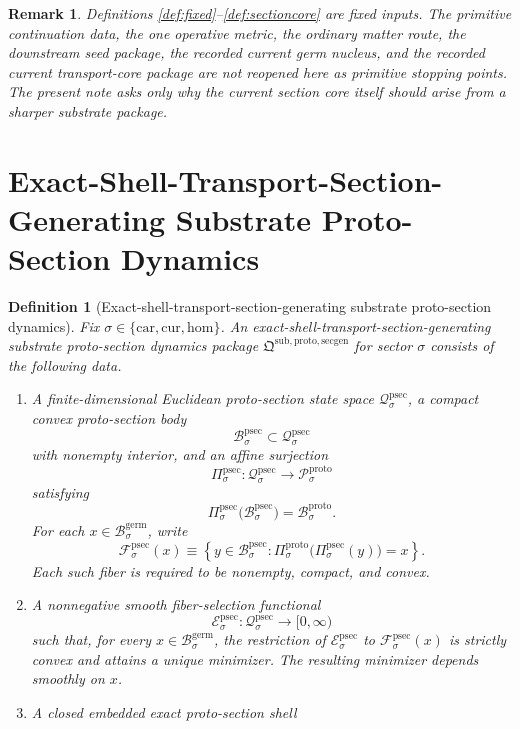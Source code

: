 \documentclass[11pt]{article}
\newcommand{\Car}{\mathrm{car}}
\newcommand{\Cur}{\mathrm{cur}}
\newcommand{\Hom}{\mathrm{hom}}
\newcommand{\GermBody}[1]{\mathcal B_{#1}^{\mathrm{germ}}}
\newcommand{\ProtoState}[1]{\mathcal P_{#1}^{\mathrm{proto}}}
\newcommand{\ProtoBody}[1]{\mathcal B_{#1}^{\mathrm{proto}}}
\newcommand{\ProtoProj}[1]{\Pi_{#1}^{\mathrm{proto}}}
\newcommand{\ProtoSectionPackage}{\mathfrak Q^{\mathrm{sub,proto,secgen}}}
\newcommand{\ProtoSectionState}[1]{\mathcal Q_{#1}^{\mathrm{psec}}}
\newcommand{\ProtoSectionBody}[1]{\mathcal B_{#1}^{\mathrm{psec}}}
\newcommand{\ProtoSectionProj}[1]{\Pi_{#1}^{\mathrm{psec}}}
\newcommand{\ProtoSectionFiber}[2]{\mathcal F_{#1}^{\mathrm{psec}}(#2)}
\newcommand{\ProtoSectionFunctional}[1]{\mathscr E_{#1}^{\mathrm{psec}}}
\newtheorem{definition}{Definition}
\newtheorem{remark}{Remark}
\begin{document}
\begin{remark}
Definitions \ref{def:fixed}--\ref{def:sectioncore} are fixed inputs. The primitive continuation data, the one operative metric, the ordinary matter route, the downstream seed package, the recorded current germ nucleus, and the recorded current transport-core package are not reopened here as primitive stopping points. The present note asks only why the current section core itself should arise from a sharper substrate package.
\end{remark}

\section{Exact-Shell-Transport-Section-Generating Substrate Proto-Section Dynamics}

\begin{definition}[Exact-shell-transport-section-generating substrate proto-section dynamics]
\label{def:protosection}
Fix \(\sigma\in\{\Car,\Cur,\Hom\}\). An \emph{exact-shell-transport-section-generating substrate proto-section dynamics package} \(\ProtoSectionPackage\) for sector \(\sigma\) consists of the following data.
\begin{enumerate}
    \item A finite-dimensional Euclidean proto-section state space \(\ProtoSectionState{\sigma}\), a compact convex proto-section body
    \[
    \ProtoSectionBody{\sigma}\subset\ProtoSectionState{\sigma}
    \]
    with nonempty interior, and an affine surjection
    \[
    \ProtoSectionProj{\sigma}:\ProtoSectionState{\sigma}\to\ProtoState{\sigma}
    \]
    satisfying
    \[
    \ProtoSectionProj{\sigma}\bigl(\ProtoSectionBody{\sigma}\bigr)=\ProtoBody{\sigma}.
    \]
    For each \(x\in\GermBody{\sigma}\), write
    \[
    \ProtoSectionFiber{\sigma}{x}
    \equiv
    \left\{
    y\in\ProtoSectionBody{\sigma}:
    \ProtoProj{\sigma}\bigl(\ProtoSectionProj{\sigma}(y)\bigr)=x
    \right\}.
    \]
    Each such fiber is required to be nonempty, compact, and convex.
    \item A nonnegative smooth fiber-selection functional
    \[
    \ProtoSectionFunctional{\sigma}:\ProtoSectionState{\sigma}\to[0,\infty)
    \]
    such that, for every \(x\in\GermBody{\sigma}\), the restriction of \(\ProtoSectionFunctional{\sigma}\) to \(\ProtoSectionFiber{\sigma}{x}\) is strictly convex and attains a unique minimizer. The resulting minimizer depends smoothly on \(x\).
    \item A closed embedded exact proto-section shell

\end{enumerate}
\end{definition}
\end{document}
